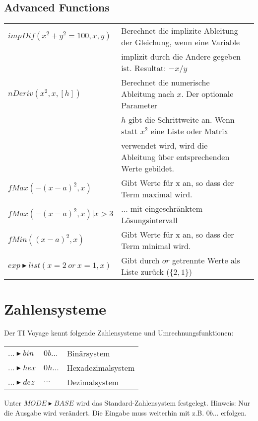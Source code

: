 \subsection{Advanced Functions}
\begin{tabular}{|l|l|l}
	\hline
	$impDif(x^2+y^2=100,x,y)$							& Berechnet die implizite Ableitung der Gleichung, wenn eine Variable \\
														& implizit durch die Andere gegeben ist. Resultat: $-x/y$		\\ \hline
	$nDeriv(x^2,x,[h])$									& Berechnet die numerische Ableitung nach $x$. Der optionale Parameter \\
														& $h$ gibt die Schrittweite an. Wenn statt $x^2$ eine Liste oder Matrix \\
														& verwendet wird, wird die Ableitung über entsprechenden Werte gebildet. \\ \hline
	$fMax(-(x-a)^2,x)$									& Gibt Werte für x an, so dass der Term maximal wird.			\\
	$fMax(-(x-a)^2,x)|x>3$								& ... mit eingeschränktem Lösungsintervall						\\ \hline
	$fMin((x-a)^2,x)$									& Gibt Werte für x an, so dass der Term minimal wird.			\\ \hline
	$exp \blacktriangleright list(x=2 \: or \: x=1,x)$	& Gibt durch $or$ getrennte Werte als Liste zurück ($\{2,1\}$) 	\\ \hline 
\end{tabular}

\section{Zahlensysteme}
Der TI Voyage kennt folgende Zahlensysteme und Umrechnungsfunktionen: \\
\begin{tabular}{l l l}
	$... \blacktriangleright bin$ & $0b...$ & Binärsystem \\
	$... \blacktriangleright hex$ & $0h...$ & Hexadezimalsystem \\
	$... \blacktriangleright dez$ & $...$	& Dezimalsystem \\
\end{tabular}

Unter $MODE \blacktriangleright BASE$ wird das Standard-Zahlensystem festgelegt.
Hinweis: Nur die Ausgabe wird verändert. Die Eingabe muss weiterhin mit z.B. $0b...$ erfolgen. \\ 
